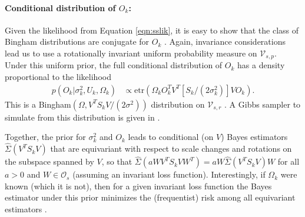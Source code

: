 \documentclass{statsoc}
\newcommand{\etr}{\text{etr}}
\begin{document}
\paragraph{Conditional distribution of $O_k$:} Given the likelihood
from Equation \ref{eqn:sslik}, it is easy to show that the class of
Bingham distributions are conjugate for $O_k$ \citep{Hoff2009,
  Hoff2012}.  Again, invariance considerations lead us to use a
rotationally invariant uniform probability measure on
$\mathcal V_{s,p}$.  Under this uniform prior, the full conditional
distribution of $O_k$ has a density proportional to the
likelihood
\begin{align}
\label{lik_vo}
 p(O_k | \sigma^2_k, U_k, \Omega_k) & \propto \etr(\Omega_kO^T_kV^T[S_k/(2\sigma^2_k)]VO_k).
\end{align}
%
\noindent This is a Bingham$(\Omega, V^T S_k V/(2\sigma^2))$
distribution on $\mathcal V_{s, r}$ \citep{Khatri1977}. A
Gibbs sampler to simulate from this distribution is given in
\citet{Hoff2012}.  

Together, the prior for $\sigma_k^2$ and $O_k$ leads to conditional
(on $V$) Bayes estimators $\hat \Sigma(V^T S_k V)$ that are
equivariant with respect to scale changes and rotations on the
subspace spanned by $V$, so
that $\hat \Sigma(a W V^T S_k V W^T) = a W \hat\Sigma(V^T
S_k V)  W$
for all $a>0$ and $ W\in \mathcal O_{s}$ (assuming an invariant
loss function). Interestingly, if $\Omega_k$ were known (which it is
not), then for a given invariant loss function the Bayes estimator
under this prior minimizes the (frequentist) risk among all
equivariant estimators \citep{Eaton1989}.
\end{document}
